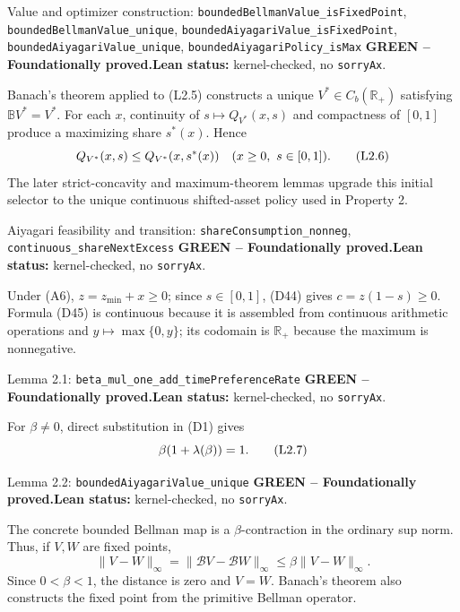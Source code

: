 \documentclass[11pt]{article}
\newcommand{\R}{\mathbb R}
\newcommand{\leanname}[1]{\nolinkurl{#1}}
\newcommand{\eqL}[1]{\refstepcounter{equation}\tag{L#1}}
\newcommand{\formalcheck}{\textbf{Lean status:} kernel-checked, no \texttt{sorryAx}.}
\newcommand{\greenstatus}{\textcolor{proved}{\textbf{GREEN -- Foundationally proved.}}}
\begin{document}
\begin{greenbox}{Value and optimizer construction:
\leanname{boundedBellmanValue_isFixedPoint},
\leanname{boundedBellmanValue_unique},
\leanname{boundedAiyagariValue_isFixedPoint},
\leanname{boundedAiyagariValue_unique},
\leanname{boundedAiyagariPolicy_isMax}}
\greenstatus\quad\formalcheck

Banach's theorem applied to (L2.5) constructs a unique
\(V^*\in C_b(\R_+)\) satisfying \(\mathbb BV^*=V^*\).  For each \(x\),
continuity of \(s\mapsto Q_{V^*}(x,s)\) and compactness of \([0,1]\) produce
a maximizing share \(s^*(x)\).  Hence
\begin{equation}
 Q_{V^*}(x,s)\le Q_{V^*}(x,s^*(x))\quad
 (x\ge0,\ s\in[0,1]). \eqL{2.6}\label{L2.6}
\end{equation}
The later strict-concavity and maximum-theorem lemmas upgrade this initial
selector to the unique continuous shifted-asset policy used in Property 2.
\end{greenbox}

\begin{greenbox}{Aiyagari feasibility and transition:
\leanname{shareConsumption_nonneg},
\leanname{continuous_shareNextExcess}}
\greenstatus\quad\formalcheck

Under (A6), \(z=z_{\min}+x\ge0\); since \(s\in[0,1]\), (D44) gives
\(c=z(1-s)\ge0\).  Formula (D45) is continuous because it is assembled from
continuous arithmetic operations and \(y\mapsto\max\{0,y\}\); its codomain is
\(\R_+\) because the maximum is nonnegative.
\end{greenbox}

\begin{greenbox}{Lemma 2.1: \leanname{beta_mul_one_add_timePreferenceRate}}
\greenstatus\quad\formalcheck

For \(\beta\ne0\), direct substitution in (D1) gives
\begin{equation}
 \beta(1+\lambda(\beta))=1. \eqL{2.7}\label{L2.7}
\end{equation}
\end{greenbox}

\begin{greenbox}{Lemma 2.2: \leanname{boundedAiyagariValue_unique}}
\greenstatus\quad\formalcheck

The concrete bounded Bellman map is a \(\beta\)-contraction in the ordinary
sup norm.  Thus, if \(V,W\) are fixed points,
\[
 \|V-W\|_\infty=\|\mathcal BV-\mathcal BW\|_\infty
 \le\beta\|V-W\|_\infty.
\]
Since \(0<\beta<1\), the distance is zero and \(V=W\).  Banach's theorem also
constructs the fixed point from the primitive Bellman operator.
\end{greenbox}
\end{document}
